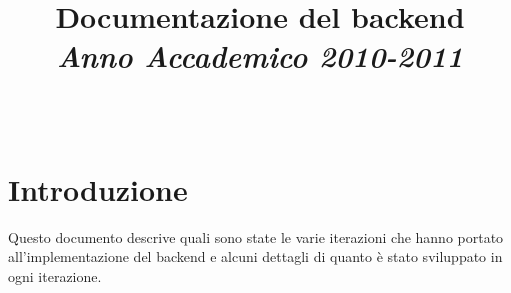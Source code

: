 \documentclass[10pt]{article}
\title{Documentazione del backend\\[2mm]{\small\emph{Anno Accademico 2010-2011}}\\[4mm]}
\author{\Nome\ \Cognome}
\begin{document}
\maketitle

\tableofcontents

\section{Introduzione}
Questo documento descrive quali sono state le varie iterazioni che hanno portato all'implementazione del backend e alcuni dettagli di quanto \`e stato sviluppato in ogni iterazione.



\printindex
\end{document}
